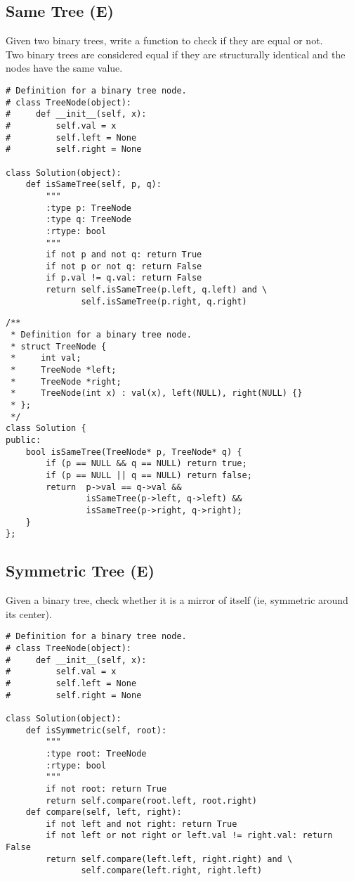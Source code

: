 \subsection{Same Tree (E)}
Given two binary trees, write a function to check if they are equal or not. \\

Two binary trees are considered equal if they are structurally identical and the nodes have the same value. \\

\begin{lstlisting}
# Definition for a binary tree node.
# class TreeNode(object):
#     def __init__(self, x):
#         self.val = x
#         self.left = None
#         self.right = None

class Solution(object):
    def isSameTree(self, p, q):
        """
        :type p: TreeNode
        :type q: TreeNode
        :rtype: bool
        """
        if not p and not q: return True
        if not p or not q: return False
        if p.val != q.val: return False
        return self.isSameTree(p.left, q.left) and \
               self.isSameTree(p.right, q.right)
\end{lstlisting}

\begin{lstlisting}
/**
 * Definition for a binary tree node.
 * struct TreeNode {
 *     int val;
 *     TreeNode *left;
 *     TreeNode *right;
 *     TreeNode(int x) : val(x), left(NULL), right(NULL) {}
 * };
 */
class Solution {
public:
    bool isSameTree(TreeNode* p, TreeNode* q) {
        if (p == NULL && q == NULL)	return true;
        if (p == NULL || q == NULL)	return false;
        return  p->val == q->val &&
                isSameTree(p->left, q->left) &&
                isSameTree(p->right, q->right);
    }
};
\end{lstlisting}


\subsection{Symmetric Tree (E)}
Given a binary tree, check whether it is a mirror of itself (ie, symmetric around its center).\\

\begin{lstlisting}
# Definition for a binary tree node.
# class TreeNode(object):
#     def __init__(self, x):
#         self.val = x
#         self.left = None
#         self.right = None

class Solution(object):
    def isSymmetric(self, root):
        """
        :type root: TreeNode
        :rtype: bool
        """
        if not root: return True
        return self.compare(root.left, root.right)
    def compare(self, left, right):
        if not left and not right: return True
        if not left or not right or left.val != right.val: return False
        return self.compare(left.left, right.right) and \
               self.compare(left.right, right.left)
\end{lstlisting}

